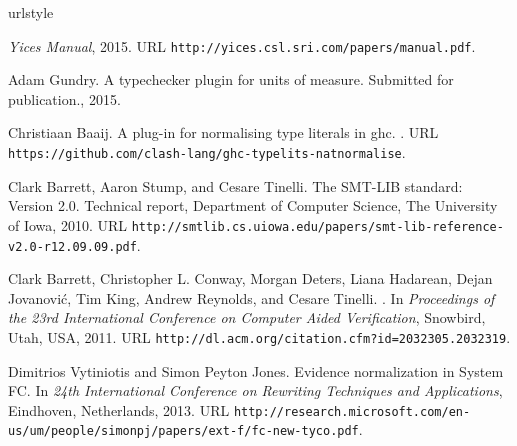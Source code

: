 \documentclass{sigplanconf}
\begin{document}
% 
% 




\begin{thebibliography}{}
\softraggedright

\providecommand{\natexlab}[1]{#1}
\providecommand{\url}[1]{\texttt{#1}}
\expandafter\ifx\csname urlstyle\endcsname\relax
  \providecommand{\doi}[1]{doi: #1}\else
  \providecommand{\doi}{doi: \begingroup \urlstyle{rm}\Url}\fi

\emph{Yices Manual}, 2015.
\newblock URL \url{http://yices.csl.sri.com/papers/manual.pdf}.

{Adam Gundry}.
\newblock A typechecker plugin for units of measure.
\newblock Submitted for publication., 2015.

{Christiaan Baaij}.
\newblock A plug-in for normalising type literals in ghc.
.
\newblock URL \url{https://github.com/clash-lang/ghc-typelits-natnormalise}.

{Clark Barrett}, {Aaron Stump}, and {Cesare Tinelli}.
\newblock The {SMT-LIB} standard: Version 2.0.
\newblock Technical report, Department of Computer Science, The University of
  Iowa, 2010.
\newblock URL
  \url{http://smtlib.cs.uiowa.edu/papers/smt-lib-reference-v2.0-r12.09.09.pdf}.

{Clark Barrett}, {Christopher L. Conway}, {Morgan Deters}, {Liana Hadarean},
  {Dejan Jovanovi\'{c}}, {Tim King}, {Andrew Reynolds}, and {Cesare Tinelli}.
.
\newblock In \emph{Proceedings of the 23rd International Conference on Computer
  Aided Verification}, Snowbird, Utah, USA, 2011.
\newblock URL \url{http://dl.acm.org/citation.cfm?id=2032305.2032319}.

{Dimitrios Vytiniotis} and {Simon Peyton Jones}.
\newblock Evidence normalization in System FC.
\newblock In \emph{24th International Conference on Rewriting Techniques and
  Applications}, Eindhoven, Netherlands, 2013.
\newblock URL
  \url{http://research.microsoft.com/en-us/um/people/simonpj/papers/ext-f/fc-new-tyco.pdf}.


\end{thebibliography}
\end{document}
